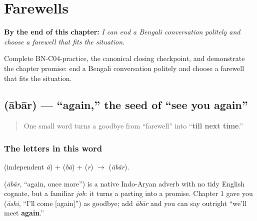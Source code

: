 
\chapter{Farewells}
\label{ch:farewells}

\begin{chapteropening}
\textbf{By the end of this chapter:} \emph{I can end a Bengali conversation politely and choose a farewell that fits the situation.}

Complete BN-C04-practice, the canonical closing checkpoint, and demonstrate the chapter promise: end a Bengali conversation politely and choose a farewell that fits the situation.
\end{chapteropening}

\section[\bn{আবার}]{ (ābār) — \textquotedblleft{}again,\textquotedblright{} the seed of \textquotedblleft{}see you again\textquotedblright{}}

\label{lesson:BN-C04-abar}



\begin{quote}
One small word turns a goodbye from \textquotedblleft{}farewell\textquotedblright{} into \textquotedblleft{}\textbf{till next time}.\textquotedblright{}
\end{quote}

\subsection*{The letters in this word}
\textbf{} (independent \emph{ā}) + \textbf{} (\emph{bā}) + \textbf{} (\emph{r}) $\to$ \textbf{} (\emph{ābār}).

\begin{cousinweb}
\textbf{} (\emph{ābār}, \textquotedblleft{}again, once more\textquotedblright{}) is a native Indo-Aryan adverb with no tidy English cognate, but a familiar \emph{job}: it turns a parting into a promise. Chapter 1 gave you \textbf{} (\emph{āshi}, \textquotedblleft{}I'll come {[}again{]}\textquotedblright{}) as goodbye; add \emph{ābār} and you can say outright \textquotedblleft{}we'll meet \textbf{again}.\textquotedblright{}
\end{cousinweb}

